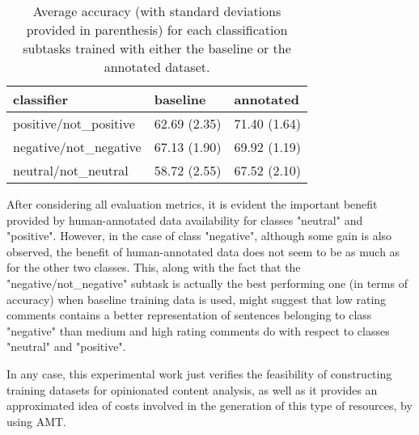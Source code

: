 \begin{table}
\begin{tabular}{|l|l|l|}
\hline
classifier &baseline &annotated \\ 
\hline
positive/not_positive &62.69 (2.35) &71.40 (1.64) \\ 
\hline
negative/not_negative &67.13 (1.90) &69.92 (1.19) \\ 
\hline
neutral/not_neutral &58.72 (2.55) &67.52 (2.10) \\ 
\hline
\end{tabular}
\caption{Average accuracy (with standard deviations provided in parenthesis) 
for each classification subtasks trained with either the baseline or the annotated dataset.}
\label{tc_accu}
\end{table}

After considering all evaluation metrics, it is evident the important benefit provided by human-annotated data 
availability for classes "neutral" and "positive". However, in the case of class "negative", although some 
gain is also observed, the benefit of human-annotated data does not seem to be as much as for the other two 
classes. This, along with the fact that the "negative/not_negative" subtask is actually the best performing
one (in terms of accuracy) when baseline training data is used, might suggest that low rating comments contains 
a better representation of sentences belonging to class "negative" than medium and high rating comments do with
respect to classes "neutral" and "positive". 

In any case, this experimental work just verifies the feasibility of constructing training datasets for
opinionated content analysis, as well as it provides an approximated idea of costs involved in the generation
of this type of resources, by using AMT.



